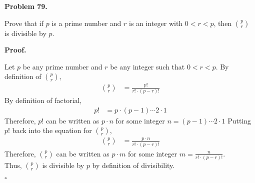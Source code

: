 \documentclass{article}
\newenvironment{problem}[1]{
    \begin{mdframed}[backgroundcolor=gray!20, skipabove=\baselineskip, skipbelow=\baselineskip, nobreak=true, innerleftmargin=10pt, innerrightmargin=10pt, innertopmargin=10pt, innerbottommargin=10pt]
    \textbf{Problem #1.}
}{
    \end{mdframed}
}
\newenvironment{proof}{
    \begin{mdframed}[nobreak=false, innerleftmargin=10pt, innerrightmargin=10pt, innertopmargin=10pt, innerbottommargin=10pt]
    \textbf{Proof.}
}{
    \hfill $\square$
    \end{mdframed}
}
\begin{document}
    \begin{problem}{79}
        Prove that if $p$ is a prime number and $r$ is an integer with $0<r<p$, then $p \choose r$ is divisible by $p$.
    \end{problem}
    \begin{proof}
        Let $p$ be any prime number and $r$ be any integer such that $0 < r < p$.
        By definition of $p \choose r$,
        \begin{align*}
            p \choose r &= \frac{p!}{r! \cdot (p-r)!}
        \end{align*}
        By definition of factorial,
        \begin{align*}
            p! &= p \cdot (p-1) \cdots 2 \cdot 1
        \end{align*}
        Therefore, $p!$ can be written as $p \cdot n$ for some integer $n = (p-1) \cdots 2 \cdot 1$
        Putting $p!$ back into the equation for $p \choose r$,
        \begin{align*}
            p \choose r &= \frac{p \cdot n}{r! \cdot (p-r)!}
        \end{align*}
        Therefore, $p \choose r$ can be written as $p \cdot m$ for some integer $m = \frac{n}{r! \cdot (p-r)!}$. \\
        Thus, $p \choose r$ is divisible by $p$ by definition of divisibility.
    \end{proof}
\end{document}

